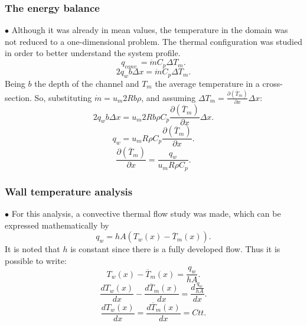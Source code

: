 \documentclass[xcolor=dvipsnames,8pt,aspectratio=34]{beamer}
\begin{document}
		
	
	
	
		\begin{frame}
		\frametitle{The energy balance}
		$\bullet$ Although it was already in mean values, the temperature in the domain was not reduced to a one-dimensional problem. The thermal configuration was studied in order to better understand the system profile.
		\begin{equation}\label{c_h_e}
		q_{conv.} = \dot{m} C_p \Delta T_m.
		\end{equation}
		\begin{equation}
		2q_w b \Delta x = \dot{m} C_p \Delta T_m.
		\end{equation}
		Being $b$ the depth of the channel and $T_m$ the average temperature in a cross-section. So, substituting $ \dot{m} = u_m 2R b \rho $, and assuming $ \Delta T_m = \frac{\partial{\left(\overline{T}_m\right)}}{\partial{x}} \Delta x $:
		\begin{equation}
		2q_w b \Delta x = u_m 2R b \rho  C_p \frac{\partial{\left(\overline{T}_m\right)}}{\partial{x}} \Delta x.
		\end{equation}     
		\begin{equation}
		q_w = u_m R \rho  C_p \frac{\partial{\left(\overline{T}_m\right)}}{\partial{x}} .
		\end{equation} 
		\begin{equation}\label{c_h_ee}
		\frac{\partial{\left(\overline{T}_m\right)}}{\partial{x}} = \frac{q_w}{u_m  R \rho  C_p } .
		\end{equation} 
		\end{frame}
	
	
	
	
		\begin{frame}
		\frametitle{Wall temperature analysis}
		$\bullet$ For this analysis, a convective thermal flow study was made, which can be expressed mathematically by
		\begin{equation}
		q_w = h A \left( T_w(x) - \overline{T}_m(x)\right).
		\end{equation}
		It is noted that $h$ is constant since there is a fully developed flow. Thus it is possible to write:
		\begin{equation}
		 T_w(x) - \overline{T}_m(x) = \frac{q_w}{hA}.
		\end{equation}
		\begin{equation}
		\frac{d T_w(x)}{d x} - \frac{d \overline{T}_m(x)}{d x} = \frac{d \frac{q_w}{hA}}{dx}.
		\end{equation}
		\begin{equation}
		\frac{d T_w(x)}{d x} = \frac{d \overline{T}_m(x)}{d x} = Ctt.
		\end{equation}	
		\end{frame}
	
\end{document}

